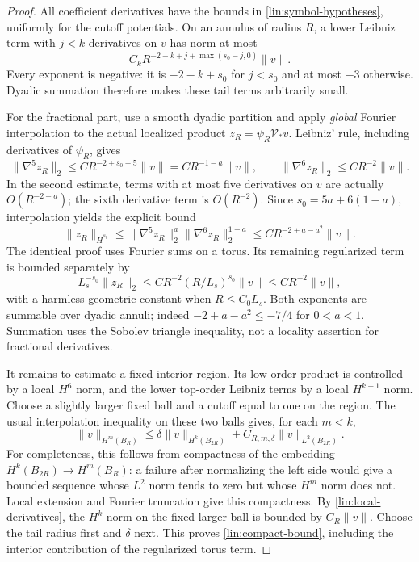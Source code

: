 \documentclass[11pt]{article}
\numberwithin{equation}{section}
\theoremstyle{definition}
\theoremstyle{remark}
\begin{document}
\begin{proof}
All coefficient derivatives have the bounds in
\eqref{lin:symbol-hypotheses}, uniformly for the cutoff potentials.
On an annulus of radius $R$, a lower Leibniz term with $j<k$ derivatives
on $v$ has norm at most
\begin{equation}\label{lin:top-tail}
 C_kR^{-2-k+j+\max(s_0-j,0)}\|v\|.
\end{equation}
Every exponent is negative: it is $-2-k+s_0$ for $j<s_0$ and at most
$-3$ otherwise.  Dyadic summation therefore makes these tail terms
arbitrarily small.

For the fractional part, use a smooth dyadic partition and apply
\emph{global} Fourier interpolation to the actual localized product
$z_R=\psi_R\mathcal V_*v$.  Leibniz' rule, including derivatives of
$\psi_R$, gives
\[
 \|\nabla^5z_R\|_2\le CR^{-2+s_0-5}\|v\|
                     =CR^{-1-a}\|v\|,
 \qquad
 \|\nabla^6z_R\|_2\le CR^{-2}\|v\|.
\]
In the second estimate, terms with at most five derivatives on $v$ are
actually $O(R^{-2-a})$; the sixth derivative term is $O(R^{-2})$.
Since $s_0=5a+6(1-a)$, interpolation yields the explicit bound
\begin{equation}\label{lin:fractional-tail}
 \|z_R\|_{\dot H^{s_0}}
 \le\|\nabla^5z_R\|_2^a\|\nabla^6z_R\|_2^{1-a}
 \le CR^{-2+a-a^2}\|v\|.
\end{equation}
The identical proof uses Fourier sums on a torus.  Its remaining
regularized term is bounded separately by
\begin{equation}\label{lin:zero-mode-tail}
 L_s^{-s_0}\|z_R\|_2
 \le CR^{-2}(R/L_s)^{s_0}\|v\|
 \le CR^{-2}\|v\|,
\end{equation}
with a harmless geometric constant when $R\le C_0L_s$.
Both exponents are summable over dyadic annuli; indeed
$-2+a-a^2\le-7/4$ for $0<a<1$.  Summation uses the Sobolev triangle
inequality, not a locality assertion for fractional derivatives.

It remains to estimate a fixed interior region.  Its low-order product
is controlled by a local $H^6$ norm, and the lower top-order Leibniz
terms by a local $H^{k-1}$ norm.  Choose a slightly larger fixed ball
and a cutoff equal to one on the region.  The usual interpolation
inequality on these two balls gives, for each $m<k$,
\[
 \|v\|_{H^m(B_R)}
 \le\delta\|v\|_{H^k(B_{2R})}
                 +C_{R,m,\delta}\|v\|_{L^2(B_{2R})}.
\]
For completeness, this follows from compactness of the embedding
$H^k(B_{2R})\to H^m(B_R)$: a failure after normalizing the left side
would give a bounded sequence whose $L^2$ norm tends to zero but whose
$H^m$ norm does not.  Local extension and Fourier truncation give this
compactness.  By \eqref{lin:local-derivatives}, the $H^k$ norm on the
fixed larger ball is bounded by $C_R\|v\|$.  Choose the tail radius
first and $\delta$ next.  This proves \eqref{lin:compact-bound}, including
the interior contribution of the regularized torus term.
\end{proof}
\end{document}
